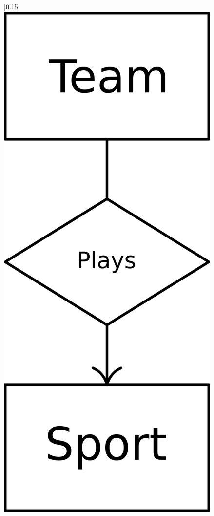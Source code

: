 \documentclass[a4paper]{article}
\begin{document}
\begin{figure}[H]
[0.15\linewidth]{\centering\includegraphics[width=0.6\linewidth]{entity7.png}}

\end{figure}
\end{document}
